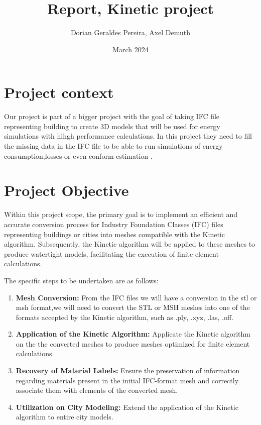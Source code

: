 \documentclass{article}
\title{Report, Kinetic project}
\author{Dorian Geraldes Pereira, Axel Demuth}
\date{March 2024}
\begin{document}
\maketitle
\tableofcontents
\newpage
\section{Project context}

Our project is part of a bigger project with the goal of taking IFC file representing building to create 3D models that will be used for energy simulations
with hihgh performance calculations. In this project they need to fill the missing data in the IFC file to be able to run simulations of energy consumption,losses or even conform estimation .


\section{Project Objective}

Within this project scope, the primary goal is to implement an efficient and accurate 
conversion process for Industry Foundation Classes (IFC) 
files representing buildings or cities into meshes compatible with the 
Kinetic algorithm. Subsequently, the Kinetic algorithm will be applied to these 
meshes to produce watertight models, facilitating the execution of finite element calculations.

The specific steps to be undertaken are as follows:

\begin{enumerate}   
    \item \textbf{Mesh Conversion:} From the IFC files we will have a 
    conversion in the stl or msh format,we will need to convert the STL 
    or MSH meshes into one of the formats accepted by the Kinetic algorithm, 
    such as .ply, .xyz, .las, .off.
    
    \item \textbf{Application of the Kinetic Algorithm:} Applicate  
    the Kinetic algorithm on the the converted 
    meshes to produce meshes optimized for finite element calculations.
    
    \item \textbf{Recovery of Material Labels:} Ensure the preservation 
    of information regarding materials present in the initial IFC-format mesh 
    and correctly associate them with elements of the converted mesh.
    
    \item \textbf{Utilization on City Modeling:} Extend the application of 
    the Kinetic algorithm to entire city models.
\end{enumerate}
\end{document}
